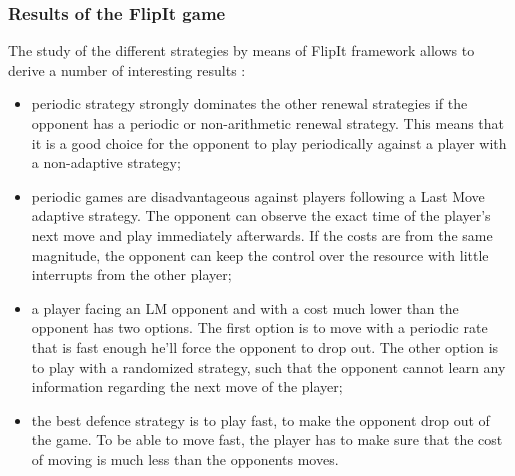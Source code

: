 \subsubsection{Results of the FlipIt game}
The study of the different strategies by means of FlipIt framework allows to derive a number of interesting results \cite{FlipIt}:  
\begin{itemize}
\item periodic strategy strongly dominates the other renewal strategies if the opponent has a periodic or non-arithmetic renewal strategy. This means that it is a good choice for the opponent to play periodically against a player with a non-adaptive strategy;
\item periodic games are disadvantageous against players following a Last Move adaptive strategy. The opponent can observe the exact time of the player's next move and play immediately afterwards. If the costs are from the same magnitude, the opponent can keep the control over the resource with little interrupts from the other player; 
\item a player facing an LM opponent and with a cost much lower than the opponent has two options. The first option is to move with a periodic rate that is fast enough he'll force the opponent to drop out. The other option is to play with a randomized strategy, such that the opponent cannot learn any information regarding the next move of the player;
\item the best defence strategy is to play fast, to make the opponent drop out of the game. To be able to move fast, the player has to make sure that the cost of moving is much less than the opponents moves.
\end{itemize}
 

